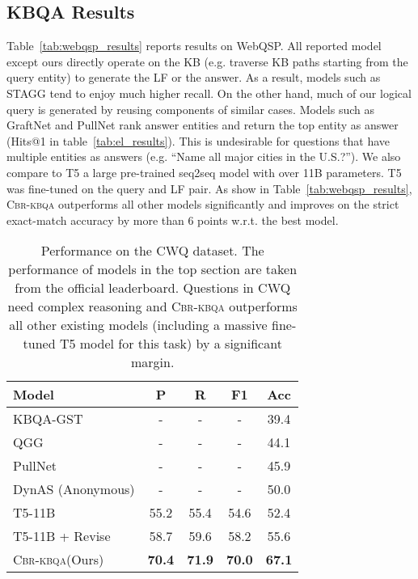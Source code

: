 \documentclass{article}
\newcommand{\alg}{\textsc{Cbr-kbqa}\xspace}
\begin{document}
\subsection{KBQA Results}
\label{sub:main_results}
Table~\ref{tab:webqsp_results} reports results on WebQSP. All reported model except ours directly operate on the KB (e.g. traverse KB paths starting from the query entity) to generate the LF or the answer. As a result, models such as STAGG tend to enjoy much higher recall. On the other hand, much of our logical query is generated by reusing components of similar cases. Models such as GraftNet \cite{sun2018open} and PullNet \cite{sun2019pullnet} rank answer entities and return the top entity as answer (Hits@1 in table~\ref{tab:el_results}). This is undesirable for questions that have multiple entities as answers (e.g. ``Name all major cities in the U.S.?''). We also compare to T5 \cite{t5} a large pre-trained seq2seq model with over 11B parameters. T5 was fine-tuned on the query and LF pair. As show in Table~\ref{tab:webqsp_results}, \alg outperforms all other models significantly and improves on the strict exact-match accuracy by more than 6 points w.r.t. the best model.

\begin{table}[t]
\centering
\setlength{\tabcolsep}{4pt}
\begin{tabular}{l c c c c}
\toprule
Model & P & R & F1 & Acc \\
\midrule
KBQA-GST \cite{lan2019knowledge} & - & - & - & 39.4\\
QGG  \cite{lan2020query} & - & - & - & 44.1 \\
PullNet \cite{sun2019pullnet}& - & - & - & 45.9 \\
DynAS (Anonymous) & - & - & - & 50.0 \\
\midrule
T5-11B \cite{t5} & 55.2 & 55.4 & 54.6 & 52.4\\
T5-11B + Revise & 58.7 & 59.6& 58.2& 55.6\\
\alg (Ours) & \textbf{70.4} & \textbf{71.9} & \textbf{70.0} & \textbf{67.1} \\
\bottomrule
\end{tabular}
\caption{Performance on the CWQ dataset. The performance of models in the top section are taken from the official leaderboard. Questions in CWQ need complex reasoning and \alg outperforms all other existing models (including a massive fine-tuned T5 model for this task) by a significant margin.} 
\label{tab:cwq_results}
\end{table}
\end{document}
